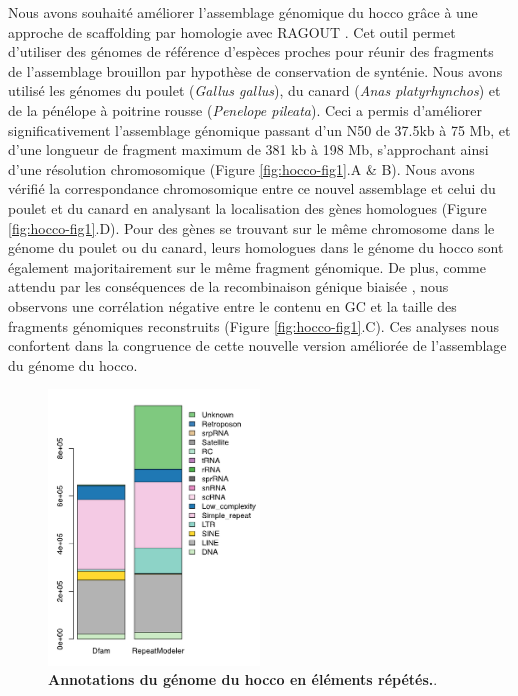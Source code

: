 Nous avons souhaité améliorer l’assemblage génomique du hocco grâce à une approche de scaffolding par homologie avec RAGOUT \citep{kolmogorov_chromosome_2018}. Cet outil permet d'utiliser des génomes de référence d’espèces proches pour réunir des fragments de l’assemblage brouillon par hypothèse de conservation de synténie. Nous avons utilisé les génomes du poulet (\textit{Gallus gallus}), du canard (\textit{Anas platyrhynchos}) et de la pénélope à poitrine rousse (\textit{Penelope pileata}). Ceci a permis d’améliorer significativement l’assemblage génomique passant d’un N50 de 37.5kb à 75 Mb, et d’une longueur de fragment maximum de 381 kb à 198 Mb, s’approchant ainsi d’une résolution chromosomique (Figure \ref{fig:hocco-fig1}.A \& B). Nous avons vérifié la correspondance chromosomique entre ce nouvel assemblage et celui du poulet et du canard en analysant la localisation des gènes homologues (Figure \ref{fig:hocco-fig1}.D). Pour des gènes se trouvant sur le même chromosome dans le génome du poulet ou du canard, leurs homologues dans le génome du hocco sont également majoritairement sur le même fragment génomique. De plus, comme attendu par les conséquences de la recombinaison génique biaisée \citep{galtier_gc-content_2001}, nous observons une corrélation négative entre le contenu en GC et la taille des fragments génomiques reconstruits (Figure \ref{fig:hocco-fig1}.C). Ces analyses nous confortent dans la congruence de cette nouvelle version améliorée de l’assemblage du génome du hocco. \\


\begin{figure}[h]
    \centering
    \includegraphics[width=0.5\textwidth, page=1] {figures/annexes/hocco-fig2.png}
    \caption[Annotations du génome du hocco en éléments répétés.]{
    \textbf{Annotations du génome du hocco en éléments répétés.}.  \\
    }
    \label{fig:hocco-fig2}
\end{figure} 

